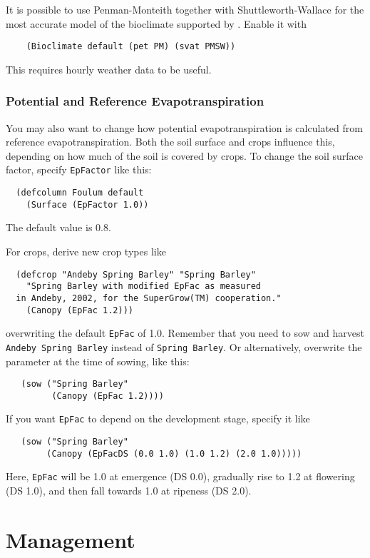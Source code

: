 \documentclass[a4paper,11pt]{article}
\begin{document}
It is possible to use Penman-Monteith together with
Shuttleworth-Wallace for the most accurate model of the bioclimate
supported by \daisy{}.  Enable it with
\begin{verbatim}
    (Bioclimate default (pet PM) (svat PMSW))
\end{verbatim}
This requires hourly weather data to be useful.  

\subsubsection{Potential and Reference Evapotranspiration}

You may also want to change how potential evapotranspiration is
calculated from reference evapotranspiration.  Both the soil surface
and crops influence this, depending on how much of the soil is covered
by crops.  To change the soil surface factor, specify
\texttt{EpFactor} like this:
\begin{verbatim}
  (defcolumn Foulum default
    (Surface (EpFactor 1.0))
\end{verbatim}
The default value is 0.8.

For crops, derive new crop types like
\begin{verbatim}
  (defcrop "Andeby Spring Barley" "Spring Barley"
    "Spring Barley with modified EpFac as measured
  in Andeby, 2002, for the SuperGrow(TM) cooperation."
    (Canopy (EpFac 1.2)))
\end{verbatim}
overwriting the default \texttt{EpFac} of 1.0.  Remember that you need
to sow and harvest \texttt{Andeby Spring Barley} instead of
\texttt{Spring Barley}.  Or alternatively, overwrite the parameter at
the time of sowing, like this:
\begin{verbatim}
   (sow ("Spring Barley"
         (Canopy (EpFac 1.2))))
\end{verbatim}
If you want \texttt{EpFac} to depend on the development stage, specify
it like
\begin{verbatim}
   (sow ("Spring Barley"
        (Canopy (EpFacDS (0.0 1.0) (1.0 1.2) (2.0 1.0)))))
\end{verbatim}
Here, \texttt{EpFac} will be 1.0 at emergence (DS 0.0), gradually rise
to 1.2 at flowering (DS 1.0), and then fall towards 1.0 at ripeness (DS
2.0).

\section{Management}
\label{sec:management}
\end{document}
